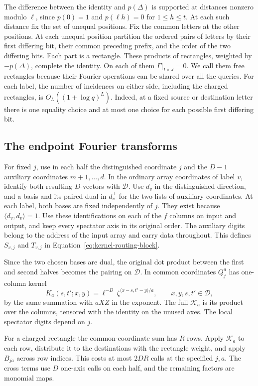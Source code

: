 The difference between the identity and \(p(\Delta)\) is supported
at distances nonzero modulo \(\ell\), since \(p(0)=1\) and
\(p(\ell h)=0\) for \(1\le h\le t\). At each such distance fix the
set of unequal positions. Fix the common letters at the other
positions. At each unequal position partition the ordered pairs of
letters by their first differing bit, their common preceding prefix,
and the order of the two differing bits. Each part is a rectangle.
These products of rectangles, weighted by \(-p(\Delta)\), complete
the identity. On each of them \(\Gamma|_{I\times J}=0\). We call them
free rectangles because their Fourier operations can be shared over
all the queries. For each label, the number of incidences on either
side, including the charged rectangles, is
\(O_L((1+\log q)^L)\). Indeed, at a fixed source or destination letter there is one equality
choice and at most one choice for each possible first differing bit.

\subsection{The endpoint Fourier transforms}

For fixed \(j\), use in each half the distinguished coordinate \(j\)
and the \(D-1\) auxiliary coordinates \(m+1,\ldots,d\). In the
ordinary array coordinates of label \(v\), identify both resulting
\(D\)-vectors with \(\mathcal D\). Use \(d_v\) in the distinguished
direction, and a basis and its paired dual in \(d_v^\perp\) for the
two lists of auxiliary coordinates. At each label, both bases are fixed independently of \(j\).
They exist because \(\langle d_v,d_v\rangle=1\). Use these
identifications on each of the \(f\) columns on input and output, and
keep every spectator axis in its original order. The auxiliary digits
belong to the address of the input array and carry data throughout.
This defines \(S_{v,j}\) and \(T_{v,j}\) in
Equation~\eqref{eq:kernel-routing-block}.

Since the two chosen bases are dual,
the original dot product between the first and second halves becomes
the pairing on \(\mathcal D\). In common coordinates \(Q_j^a\) has
one-column kernel
\[
 K_a(s,t';x,y)=\ell^{-D}\,
              \zeta^{\langle x-s,t'-y\rangle/a},
 \qquad x,y,s,t'\in\mathcal D,
\]
by the same summation with \(aXZ\) in the exponent. The full
\(\mathcal K_a\) is its product over the columns, tensored with the
identity on the unused axes. The local spectator digits depend on \(j\).

For a charged rectangle the common-coordinate sum has \(R\) rows.
Apply \(\mathcal K_a\) to each row, distribute it to the destinations
with the rectangle weight, and apply \(B_{ja}\) across row indices.
This costs at most \(2DR\) calls at the specified \(j,a\). The
cross terms use \(D\) one-axis calls on each half, and the remaining
factors are monomial maps.

